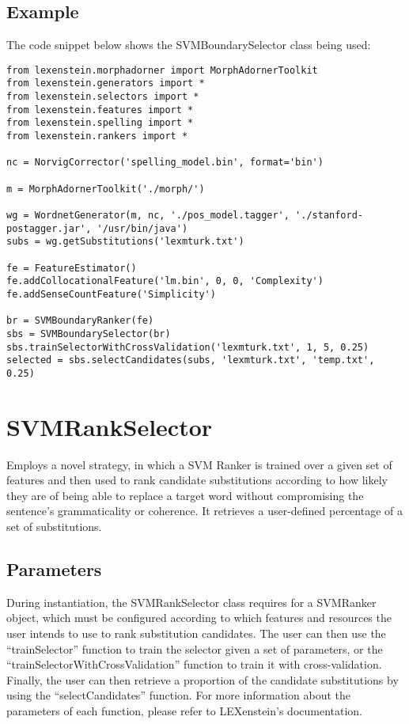 \subsection{Example}

The code snippet below shows the SVMBoundarySelector class being used:

\begin{lstlisting}
from lexenstein.morphadorner import MorphAdornerToolkit
from lexenstein.generators import *
from lexenstein.selectors import *
from lexenstein.features import *
from lexenstein.spelling import *
from lexenstein.rankers import *

nc = NorvigCorrector('spelling_model.bin', format='bin')

m = MorphAdornerToolkit('./morph/')

wg = WordnetGenerator(m, nc, './pos_model.tagger', './stanford-postagger.jar', '/usr/bin/java')
subs = wg.getSubstitutions('lexmturk.txt')

fe = FeatureEstimator()
fe.addCollocationalFeature('lm.bin', 0, 0, 'Complexity')
fe.addSenseCountFeature('Simplicity')

br = SVMBoundaryRanker(fe)
sbs = SVMBoundarySelector(br)
sbs.trainSelectorWithCrossValidation('lexmturk.txt', 1, 5, 0.25)
selected = sbs.selectCandidates(subs, 'lexmturk.txt', 'temp.txt', 0.25)
\end{lstlisting}










\section{SVMRankSelector}

Employs a novel strategy, in which a SVM Ranker is trained over a given set of features and then used to rank candidate substitutions according to how likely they are of being able to replace a target word without compromising the sentence's grammaticality or coherence. It retrieves a user-defined percentage of a set of substitutions.

\subsection{Parameters}

During instantiation, the SVMRankSelector class requires for a SVMRanker object, which must be configured according to which features and resources the user intends to use to rank substitution candidates. The user can then use the ``trainSelector'' function to train the selector given a set of parameters, or the ``trainSelectorWithCrossValidation'' function to train it with cross-validation. Finally, the user can then retrieve a proportion of the candidate substitutions by using the ``selectCandidates'' function. For more information about the parameters of each function, please refer to LEXenstein's documentation.

